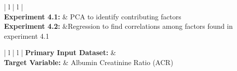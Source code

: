 \begin{center}
\begin{table}
\caption{Set 4: ACR Values and Nutrients}
\begin{tabular}{| l  | l | }
\hline
{} { \noindent {}} \\
\hline
\noindent \textbf{Experiment 4.1:} & PCA to identify contributing factors \\
\hline
\noindent \textbf{Experiment 4.2:} &Regression to find correlations among factors found in experiment 4.1 \\
\hline
\end{tabular}
\end{table}
\end{center}
\nobreak
\begin{center}
\begin{table}
\small
\caption{Set 5: ACR Values and Food Subgroups}
\begin{tabular}{| l  | l | }
\hline
\noindent \textbf{Primary Input Dataset:} &  \\
\hline
\noindent \textbf{Target Variable:} & Albumin Creatinine Ratio (ACR) \\
\hline
{} { } \\
\hline
\end{tabular}
\end{table}
\end{center}

